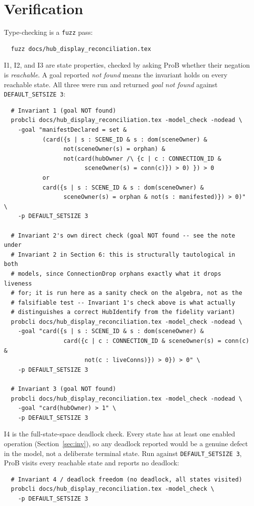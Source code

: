 \documentclass[a4paper,10pt,fleqn]{article}
\begin{document}
\section{Verification}
\label{sec:verify}

Type-checking is a \texttt{fuzz} pass:
\begin{verbatim}
  fuzz docs/hub_display_reconciliation.tex
\end{verbatim}

I1, I2, and I3 are state properties, checked by asking ProB whether their
negation is \emph{reachable}.  A goal reported \emph{not found} means the
invariant holds on every reachable state.  All three were run and returned
\emph{goal not found} against \texttt{DEFAULT\_SETSIZE 3}:
\begin{verbatim}
  # Invariant 1 (goal NOT found)
  probcli docs/hub_display_reconciliation.tex -model_check -nodead \
    -goal "manifestDeclared = set &
           (card({s | s : SCENE_ID & s : dom(sceneOwner) &
                 not(sceneOwner(s) = orphan) &
                 not(card(hubOwner /\ {c | c : CONNECTION_ID &
                       sceneOwner(s) = conn(c)}) > 0) }) > 0
           or
           card({s | s : SCENE_ID & s : dom(sceneOwner) &
                 sceneOwner(s) = orphan & not(s : manifested)}) > 0)" \
    -p DEFAULT_SETSIZE 3

  # Invariant 2's own direct check (goal NOT found -- see the note under
  # Invariant 2 in Section 6: this is structurally tautological in both
  # models, since ConnectionDrop orphans exactly what it drops liveness
  # for; it is run here as a sanity check on the algebra, not as the
  # falsifiable test -- Invariant 1's check above is what actually
  # distinguishes a correct HubIdentify from the fidelity variant)
  probcli docs/hub_display_reconciliation.tex -model_check -nodead \
    -goal "card({s | s : SCENE_ID & s : dom(sceneOwner) &
                 card({c | c : CONNECTION_ID & sceneOwner(s) = conn(c) &
                       not(c : liveConns)}) > 0}) > 0" \
    -p DEFAULT_SETSIZE 3

  # Invariant 3 (goal NOT found)
  probcli docs/hub_display_reconciliation.tex -model_check -nodead \
    -goal "card(hubOwner) > 1" \
    -p DEFAULT_SETSIZE 3
\end{verbatim}

I4 is the full-state-space deadlock check.  Every state has at least one
enabled operation (Section~\ref{sec:inv}), so any deadlock reported would
be a genuine defect in the model, not a deliberate terminal state.  Run
against \texttt{DEFAULT\_SETSIZE 3}, ProB visits every reachable state and
reports no deadlock:
\begin{verbatim}
  # Invariant 4 / deadlock freedom (no deadlock, all states visited)
  probcli docs/hub_display_reconciliation.tex -model_check \
    -p DEFAULT_SETSIZE 3
\end{verbatim}
\end{document}
